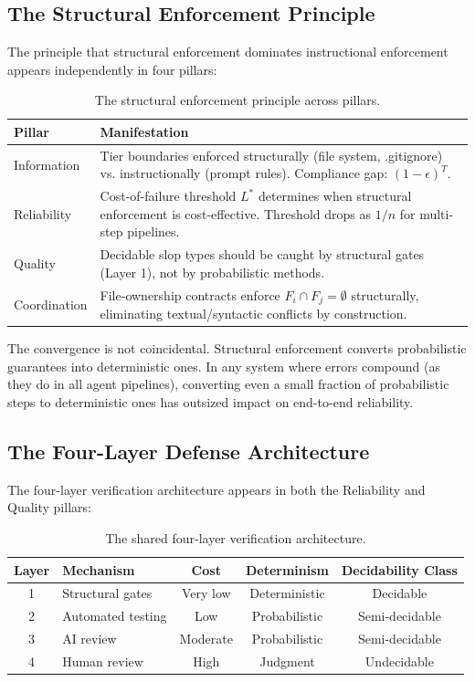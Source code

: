 \documentclass[11pt, a4paper]{googledeepmind}
\begin{document}
\subsection{The Structural Enforcement Principle}

The principle that structural enforcement dominates instructional enforcement appears independently in four pillars:

\begin{table}[h]
\centering
\caption{The structural enforcement principle across pillars.}
\label{tab:structural}
\begin{tabular}{lp{10cm}}
\toprule
\textbf{Pillar} & \textbf{Manifestation} \\
\midrule
Information & Tier boundaries enforced structurally (file system, .gitignore) vs. instructionally (prompt rules). Compliance gap: $(1-\epsilon)^T$. \\
Reliability & Cost-of-failure threshold $L^*$ determines when structural enforcement is cost-effective. Threshold drops as $1/n$ for multi-step pipelines. \\
Quality & Decidable slop types should be caught by structural gates (Layer 1), not by probabilistic methods. \\
Coordination & File-ownership contracts enforce $F_i \cap F_j = \emptyset$ structurally, eliminating textual/syntactic conflicts by construction. \\
\bottomrule
\end{tabular}
\end{table}

The convergence is not coincidental. Structural enforcement converts probabilistic guarantees into deterministic ones. In any system where errors compound (as they do in all agent pipelines), converting even a small fraction of probabilistic steps to deterministic ones has outsized impact on end-to-end reliability.

\subsection{The Four-Layer Defense Architecture}

The four-layer verification architecture appears in both the Reliability and Quality pillars:

\begin{table}[h]
\centering
\caption{The shared four-layer verification architecture.}
\label{tab:four-layer}
\begin{tabular}{clccc}
\toprule
\textbf{Layer} & \textbf{Mechanism} & \textbf{Cost} & \textbf{Determinism} & \textbf{Decidability Class} \\
\midrule
1 & Structural gates & Very low & Deterministic & Decidable \\
2 & Automated testing & Low & Probabilistic & Semi-decidable \\
3 & AI review & Moderate & Probabilistic & Semi-decidable \\
4 & Human review & High & Judgment & Undecidable \\
\bottomrule
\end{tabular}
\end{table}
\end{document}
